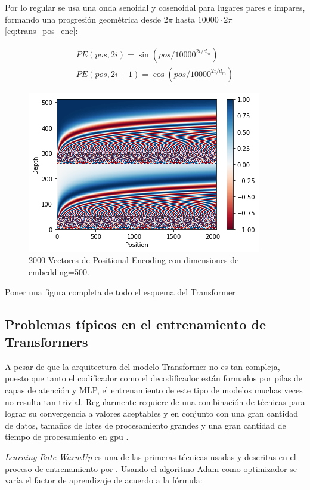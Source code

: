 Por lo regular se usa una onda senoidal y cosenoidal para lugares pares e impares, formando una progresión
geométrica desde $2\pi$ hasta $10000 \cdot 2\pi$ \ref{eq:trans_pos_enc}:

\begin{equation}
    \begin{split}
        PE(pos, 2i) = \sin(pos/10000^{2i/d_m})\\
        PE(pos, 2i+1) = \cos(pos/10000^{2i/d_m})
    \end{split}
    \label{eq:trans_pos_enc}
\end{equation}


\begin{figure}[ht!]
    \centering
    \includegraphics[width=0.5 \textwidth]{Chapters/1. Transformer/Figures/transformer/pos_enc.png}
    \caption{2000 Vectores de Positional Encoding con dimensiones de embedding=500.}
    \label{fig:trans_pos_enc}
\end{figure}

Poner una figura completa de todo el esquema del Transformer

\subsection{Problemas típicos en el entrenamiento de Transformers}

A pesar de que la arquitectura del modelo Transformer no es tan compleja, puesto que tanto el
codificador como el decodificador están formados por pilas de capas de atención y MLP, el
entrenamiento de este tipo de modelos muchas veces no resulta tan trivial. Regularmente requiere de
una combinación de técnicas para lograr su convergencia a valores aceptables y en conjunto con una
gran cantidad de datos, tamaños de lotes de procesamiento grandes y una gran cantidad de tiempo
de procesamiento en gpu \cite{DBLP:journals/corr/abs-1804-00247}.

\textit{Learning Rate WarmUp} es una de las primeras técnicas usadas y descritas en el proceso de
entrenamiento por \citeauthor{Vaswani}. Usando el algoritmo Adam como optimizador se varía el factor
de aprendizaje de acuerdo a la fórmula:

